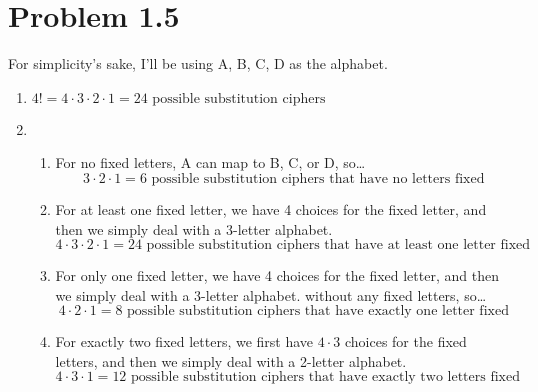\documentclass{article}
\begin{document}
\section*{Problem 1.5}
For simplicity's sake, I'll be using A, B, C, D as the alphabet.
\begin{enumerate}[label=(\alph*)]
    \item \(4! = 4 \cdot 3 \cdot 2 \cdot 1 = 24 \text{ possible substitution ciphers}\)
    \item \begin{enumerate}[label=(\roman*)]
              \item For no fixed letters, A can map to B, C, or D, so\dots
                    \begin{equation*}
                        3 \cdot 2 \cdot 1 = 6 \text { possible substitution ciphers that have no letters fixed}
                    \end{equation*}
              \item For at least one fixed letter, we have 4 choices for the fixed letter, and then we simply deal with a 3-letter alphabet.
                    \begin{equation*}
                        4 \cdot 3 \cdot 2 \cdot 1 = 24 \text { possible substitution ciphers that have at least one letter fixed}
                    \end{equation*}
              \item For only one fixed letter, we have 4 choices for the fixed letter, and then we simply deal with a 3-letter alphabet.
                    without any fixed letters, so\dots
                    \begin{equation*}
                        4 \cdot 2 \cdot 1 = 8 \text { possible substitution ciphers that have exactly one letter fixed}
                    \end{equation*}
              \item For exactly two fixed letters, we first have \(4 \cdot 3\) choices for the fixed letters, and then we simply deal with a 2-letter alphabet.
                    \begin{equation*}
                        4 \cdot 3 \cdot 1 = 12 \text { possible substitution ciphers that have exactly two letters fixed}
                    \end{equation*}
          \end{enumerate}
\end{enumerate}
\end{document}
